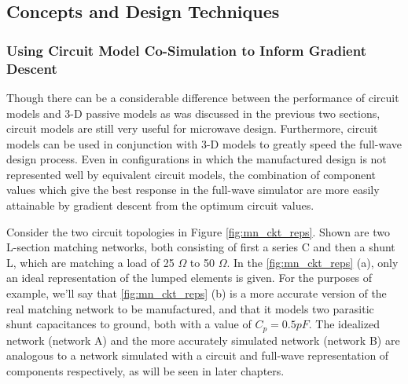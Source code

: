 \documentclass[12pt]{usfcoe}
\begin{document}
    \subsection{Concepts and Design Techniques}
    \subsubsection{Using Circuit Model Co-Simulation to Inform Gradient Descent}
    \label{cosimulation_inform_3D}
        Though there can be a considerable difference between the performance of circuit
    models and 3-D passive models as was discussed in the previous two sections, circuit models are still very useful for microwave design. 
    Furthermore, circuit models can be used in conjunction with 3-D models to greatly speed the full-wave design process. 
    Even in configurations in which the manufactured design is not represented well by equivalent circuit models, the combination of component values which give the best response in the full-wave simulator are more easily attainable by gradient descent from the optimum circuit values. 
    
    Consider the two circuit topologies in Figure \ref{fig:mn_ckt_reps}. 
    Shown are two L-section matching networks, both consisting of first a series C and then a shunt L, which are matching a load of 25 $\Omega$ to 50 $\Omega$. 
    In the \ref{fig:mn_ckt_reps} (a), only an ideal representation of the lumped elements is given. For the purposes of example, we'll say that \ref{fig:mn_ckt_reps} (b) is a more accurate version of the real matching network to be manufactured, and that it models two parasitic shunt capacitances to ground, both with a value of $C_p = 0.5 pF$. The idealized network (network A) and the more accurately simulated network (network B) are analogous to a network simulated with a circuit and full-wave representation of components respectively, as will be seen in later chapters. 
    
\end{document}
